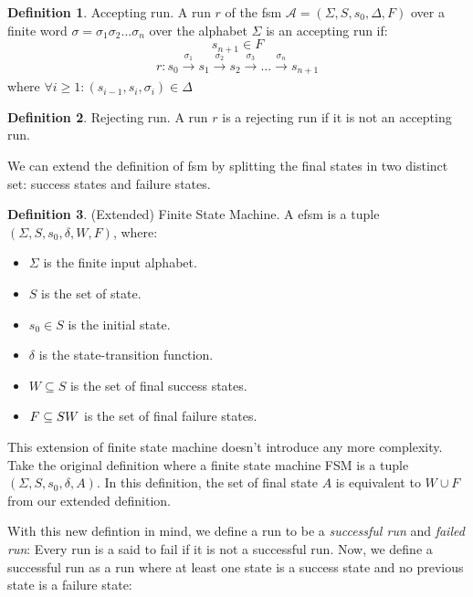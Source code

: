 \documentclass[12pt]{article}
\theoremstyle{definition}
\newtheorem{definition}{Definition}[section]
\theoremstyle{definition}
\theoremstyle{remark}
\newcommand{\A}{\mathcal{A}}
\begin{document}
\theoremstyle{definition}
\begin{definition}{Accepting run.} A run $r$ of the \gls{fsm} $\A = (\Sigma, S, s_{0}, \Delta, F)$ over a finite word $\sigma = \sigma_1 \sigma_2 ... \sigma_n$ over the alphabet $\Sigma$ is an accepting run if:
$$s_{n+1} \in F$$
$$r: s_0 \xrightarrow[]{\sigma_1} s_1 \xrightarrow[]{\sigma_2} s_2 \xrightarrow[]{\sigma_3} ... \xrightarrow[]{\sigma_n} s_{n+1}$$ where $\forall i \ge 1: (s_{i-1}, s_i, \sigma_i) \in \Delta$
\end{definition}

\theoremstyle{definition}
\begin{definition}{Rejecting run.} A run $r$ is a rejecting run if it is not an accepting run.
\end{definition}

We can extend the definition of \gls{fsm} by splitting the final states in two distinct set: success states and failure states.

\theoremstyle{definition}
\begin{definition}{(Extended) Finite State Machine.} A \gls{efsm} is a tuple $(\Sigma, S, s_{0},\delta, W, F)$, where:
\begin{itemize}
\item $\Sigma$ is the finite input alphabet.
\item $S$ is the set of state.
\item $s_{0} \in S$ is the initial state.
\item $\delta$ is the state-transition function.
\item $W \subseteq S$ is the set of final success states.
\item $F \subseteq S \\ W$ is the set of final failure states.
\end{itemize}
\end{definition}

This extension of finite state machine doesn't introduce any more complexity. Take the original definition where a finite state machine FSM is a tuple $(\Sigma, S, s_{0},\delta, A)$. In this definition, the set of final state $A$ is equivalent to $W \cup F$ from our extended definition.

With this new defintion in mind, we define a run to be a \textit{successful run} and \textit{failed run}: Every run is a said to fail if it is not a successful run. Now, we define a successful run as a run where at least one state is a success state and no previous state is a failure state:
\end{document}
